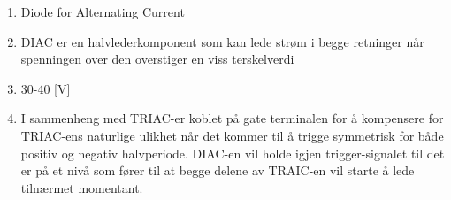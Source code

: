 \begin{solution}[name=Løsningsforslag]
	\begin{enumerate}[label=\roman*)]
	\item Diode for Alternating Current
	\item DIAC er en halvlederkomponent som kan lede strøm i begge retninger når spenningen over den overstiger en viss terskelverdi
	\item 30-40 [V]
	\item I sammenheng med TRIAC-er koblet på gate terminalen for å kompensere for TRIAC-ens naturlige ulikhet når det kommer til å trigge symmetrisk for både positiv og negativ halvperiode. DIAC-en vil holde igjen trigger-signalet til det er på et nivå som fører til at begge delene av TRAIC-en vil starte å lede tilnærmet momentant.
\end{enumerate}
\end{solution}

